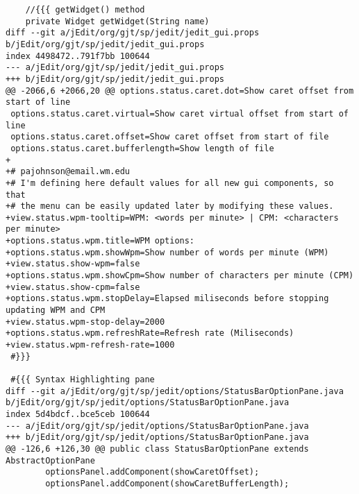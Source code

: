 \documentclass[12pt]{article}
\begin{document}
\begin{verbatim}
 	//{{{ getWidget() method
 	private Widget getWidget(String name)
diff --git a/jEdit/org/gjt/sp/jedit/jedit_gui.props b/jEdit/org/gjt/sp/jedit/jedit_gui.props
index 4498472..791f7bb 100644
--- a/jEdit/org/gjt/sp/jedit/jedit_gui.props
+++ b/jEdit/org/gjt/sp/jedit/jedit_gui.props
@@ -2066,6 +2066,20 @@ options.status.caret.dot=Show caret offset from start of line
 options.status.caret.virtual=Show caret virtual offset from start of line
 options.status.caret.offset=Show caret offset from start of file
 options.status.caret.bufferlength=Show length of file
+
+# pajohnson@email.wm.edu
+# I'm defining here default values for all new gui components, so that
+# the menu can be easily updated later by modifying these values.
+view.status.wpm-tooltip=WPM: <words per minute> | CPM: <characters per minute>
+options.status.wpm.title=WPM options:
+options.status.wpm.showWpm=Show number of words per minute (WPM)
+view.status.show-wpm=false
+options.status.wpm.showCpm=Show number of characters per minute (CPM)
+view.status.show-cpm=false
+options.status.wpm.stopDelay=Elapsed miliseconds before stopping updating WPM and CPM
+view.status.wpm-stop-delay=2000
+options.status.wpm.refreshRate=Refresh rate (Miliseconds)
+view.status.wpm-refresh-rate=1000
 #}}}
 
 #{{{ Syntax Highlighting pane
diff --git a/jEdit/org/gjt/sp/jedit/options/StatusBarOptionPane.java b/jEdit/org/gjt/sp/jedit/options/StatusBarOptionPane.java
index 5d4bdcf..bce5ceb 100644
--- a/jEdit/org/gjt/sp/jedit/options/StatusBarOptionPane.java
+++ b/jEdit/org/gjt/sp/jedit/options/StatusBarOptionPane.java
@@ -126,6 +126,30 @@ public class StatusBarOptionPane extends AbstractOptionPane
 		optionsPanel.addComponent(showCaretOffset);
 		optionsPanel.addComponent(showCaretBufferLength);
 

\end{verbatim}
\end{document}
